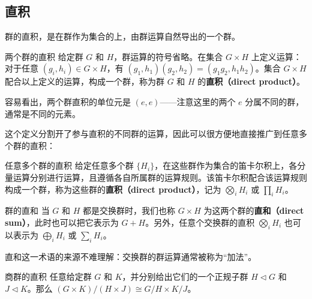 


\subsection{直积}

群的直积，是在群作为集合的上，由群运算自然导出的一个群。

\begin{definition}{两个群的直积}
给定群 $G$ 和 $H$，群运算的符号省略。在集合 $G\times H$ 上定义运算：对于任意 $(g_i, h_i)\in G\times H$，有 $(g_1, h_1)(g_2, h_2)=(g_1g_2, h_1h_2)$。集合 $G\times H$ 配合以上定义的运算，构成一个群，称为群 $G$ 和 $H$ 的\textbf{直积（direct product）}。
\end{definition}

容易看出，两个群直积的单位元是 $(e, e)$——注意这里的两个 $e$ 分属不同的群，通常是不同的元素。

这个定义分割开了参与直积的不同群的运算，因此可以很方便地直接推广到任意多个群的直积：

\begin{definition}{任意多个群的直积}
给定任意多个群 $\{H_i\}$，在这些群作为集合的笛卡尔积上，各分量运算分别进行运算，且遵循各自所属群的运算规则。该笛卡尔积配合该运算规则构成一个群，称为这些群的\textbf{直积（direct product）}，记为 $\bigotimes_iH_i$ 或 $\prod_iH_i$。
\end{definition}


\begin{definition}{群的直和}
当 $G$ 和 $H$ 都是交换群时，我们也称 $G\times H$ 为这两个群的\textbf{直和（direct sum）}，此时也可以把它表示为 $G+H$。另外，任意个交换群的直积 $\bigotimes_iH_i$ 也可以表示为 $\bigoplus_iH_i$ 或 $\sum_iH_i$。
\end{definition}

直和这一术语的来源不难理解：交换群的群运算通常被称为“加法”。

\begin{theorem}{商群的直积}\label{the_GrpPrd_1}
任意给定群 $G$ 和 $K$，并分别给出它们的一个正规子群 $H\triangleleft G$ 和 $J\triangleleft K$。那么 $(G\times K)/(H\times J)\cong G/H\times K/J$。
\end{theorem}

